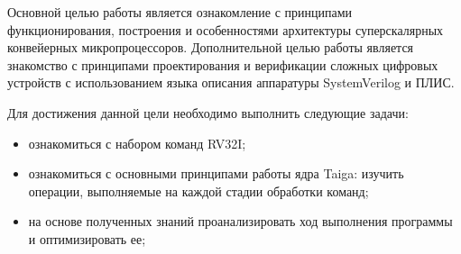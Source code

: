 
Основной целью работы является ознакомление с принципами функционирования, построения и особенностями архитектуры суперскалярных конвейерных микропроцессоров. Дополнительной целью работы является знакомство с принципами проектирования и верификации сложных цифровых устройств с использованием языка описания аппаратуры SystemVerilog и ПЛИС.

Для достижения данной цели необходимо выполнить следующие задачи:
\begin{itemize}
	\item ознакомиться с набором команд RV32I;
	\item ознакомиться с основными принципами работы ядра Taiga: изучить операции, выполняемые на каждой стадии обработки команд;
	\item на основе полученных знаний проанализировать ход выполнения программы и оптимизировать ее;
\end{itemize}
